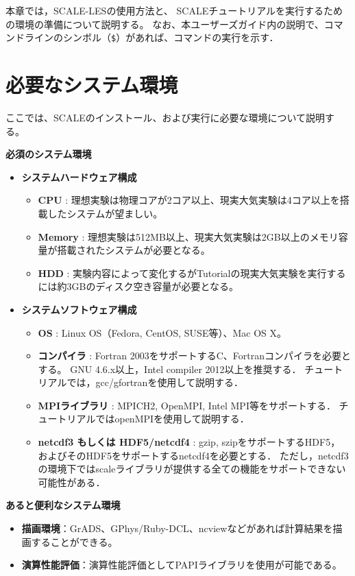 本章では，SCALE-LESの使用方法と、
SCALEチュートリアルを実行するための環境の準備について説明する。
なお、本ユーザーズガイド内の説明で、コマンドラインのシンボル（\verb|$|）があれば、コマンドの実行を示す．

\section{必要なシステム環境}
\label{sec:req_env}
ここでは、SCALEのインストール、および実行に必要な環境について説明する。

{\bf 必須のシステム環境}
\begin{itemize}
  \item {\bf システムハードウェア構成}
  \begin{itemize}
    \item {\bf CPU} : 理想実験は物理コアが2コア以上、現実大気実験は4コア以上を搭載したシステムが望ましい。
    \item {\bf Memory} : 理想実験は512MB以上、現実大気実験は2GB以上のメモリ容量が搭載されたシステムが必要となる。
    \item {\bf HDD} : 実験内容によって変化するがTutorialの現実大気実験を実行するには約3GBのディスク空き容量が必要となる。
  \end{itemize}

  \item {\bf システムソフトウェア構成}
  \begin{itemize}
  \item {\bf OS} : Linux OS（Fedora, CentOS, SUSE等）、Mac OS X。
  \item {\bf コンパイラ} : Fortran 2003をサポートするC、Fortranコンパイラを必要とする。
        GNU 4.6.x以上，Intel compiler 2012以上を推奨する．
        チュートリアルでは，gcc/gfortranを使用して説明する．
  \item {\bf MPIライブラリ} : MPICH2, OpenMPI, Intel MPI等をサポートする．
        チュートリアルではopenMPIを使用して説明する．
  \item {\bf netcdf3 もしくは HDF5/netcdf4} : gzip, szipをサポートするHDF5，
        およびそのHDF5をサポートするnetcdf4を必要とする．
        ただし，netcdf3の環境下ではscaleライブラリが提供する全ての機能をサポートできない可能性がある．
  \end{itemize}
\end{itemize}


{\bf あると便利なシステム環境}
\begin{itemize}
  \item {\bf 描画環境}：GrADS、GPhys/Ruby-DCL、ncviewなどがあれば計算結果を描画することができる。
  \item {\bf 演算性能評価}：演算性能評価としてPAPIライブラリを使用が可能である。
\end{itemize}



